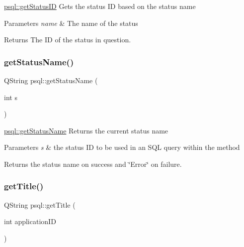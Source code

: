 \mbox{\hyperlink{classpsql_a9c02c92c09cb60c35d24375673b7df06}{psql\+::get\+Status\+ID}} Gets the status ID based on the status name 


\begin{DoxyParams}{Parameters}
{\em name} & The name of the status \\
\hline
\end{DoxyParams}
\begin{DoxyReturn}{Returns}
The ID of the status in question. 
\end{DoxyReturn}
\mbox{\label{classpsql_a5c2a64419a68a258071fd1f9a37c7c09}} 
\subsubsection{\texorpdfstring{get\+Status\+Name()}{getStatusName()}}
{\footnotesize\ttfamily Q\+String psql\+::get\+Status\+Name (\begin{DoxyParamCaption}\item[{int}]{s }\end{DoxyParamCaption})}



\mbox{\hyperlink{classpsql_a5c2a64419a68a258071fd1f9a37c7c09}{psql\+::get\+Status\+Name}} Returns the current status name 


\begin{DoxyParams}{Parameters}
{\em s} & the status ID to be used in an S\+QL query within the method \\
\hline
\end{DoxyParams}
\begin{DoxyReturn}{Returns}
the status name on success and \char`\"{}\+Error\char`\"{} on failure. 
\end{DoxyReturn}
\mbox{\label{classpsql_ada9e3be3e0866011edf53e30ec510afc}} 
\subsubsection{\texorpdfstring{get\+Title()}{getTitle()}}
{\footnotesize\ttfamily Q\+String psql\+::get\+Title (\begin{DoxyParamCaption}\item[{int}]{application\+ID }\end{DoxyParamCaption})}



